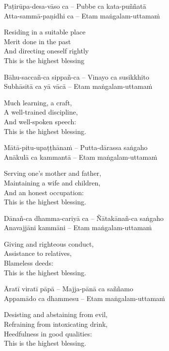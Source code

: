 Paṭirūpa-desa-vāso ca – Pubbe ca kata-puññatā\\
Atta-sammā-paṇidhi ca – Etam maṅgalam-uttamaṁ

\begin{english-verses}
  Residing in a suitable place\\
  Merit done in the past\\
  And directing oneself rightly\\
  This is the highest blessing
\end{english-verses}

Bāhu-saccañ-ca sippañ-ca – Vinayo ca susikkhito\\
Subhāsitā ca yā vācā – Etam maṅgalam-uttamaṁ

\begin{english-verses}
  Much learning, a craft,\\
  A well-trained discipline,\\
  And well-spoken speech:\\
  This is the highest blessing.
\end{english-verses}

Mātā-pitu-upaṭṭhānaṁ – Putta-dārassa saṅgaho\\
Anākulā ca kammantā – Etam maṅgalam-uttamaṁ

\begin{english-verses}
  Serving one's mother and father,\\
  Maintaining a wife and children,\\
  And an honest occupation:\\
  This is the highest blessing.
\end{english-verses}

Dānañ-ca dhamma-cariyā ca – Ñātakānañ-ca saṅgaho\\
Anavajjāni kammāni – Etam maṅgalam-uttamaṁ

\begin{english-verses}
  Giving and righteous conduct,\\
  Assistance to relatives,\\
  Blameless deeds:\\
  This is the highest blessing.
\end{english-verses}

Āratī viratī pāpā – Majja-pānā ca saññamo\\
Appamādo ca dhammesu – Etam maṅgalam-uttamaṁ

\begin{english-verses}
  Desisting and abstaining from evil,\\
  Refraining from intoxicating drink,\\
  Heedfulness in good qualities:\\
  This is the highest blessing.
\end{english-verses}

